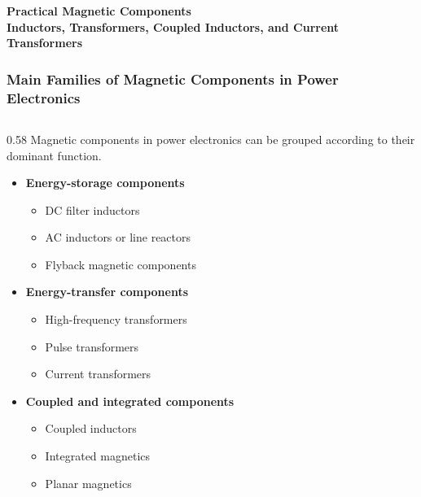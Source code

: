 \begin{frame}
\begin{center}
  \textbf{\Huge{Practical Magnetic Components}}\\[0.4cm]
  \textbf{\Large{Inductors, Transformers, Coupled Inductors, and Current Transformers}}
\end{center}
\end{frame}


\begin{frame}
    \frametitle{Main Families of Magnetic Components in Power Electronics}
    \begin{columns}
        \begin{column}{0.58\textwidth}
            Magnetic components in power electronics can be grouped according to their dominant function.

            \vspace{0.15cm}

            \begin{itemize}
                \item \textbf{Energy-storage components}
                \begin{itemize}
                    \item DC filter inductors
                    \item AC inductors or line reactors
                    \item Flyback magnetic components
                \end{itemize}

                \item \textbf{Energy-transfer components}
                \begin{itemize}
                    \item High-frequency transformers
                    \item Pulse transformers
                    \item Current transformers
                \end{itemize}

                \item \textbf{Coupled and integrated components}
                \begin{itemize}
                    \item Coupled inductors
                    \item Integrated magnetics
                    \item Planar magnetics
                \end{itemize}
            \end{itemize}
        \end{column}


\end{columns}
\end{frame}
